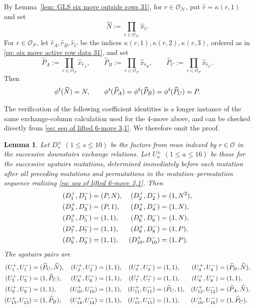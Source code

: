 \documentclass[12pt, leqno]{amsart}
\numberwithin{equation}{section}
\theoremstyle{plain}
\newtheorem{lemma}{Lemma}[section]
\theoremstyle{definition}
\renewcommand{\le}{\leqslant}
\newcommand{\seteq}{\mathbin{:=}}
\newcommand{\ii}{ \textbf{\textit{i}}}
\newcommand{\hN}{\widehat{N}}
\newcommand{\hP}{\widehat{P}}
\newcommand{\hr}{\widehat{r}}
\newcommand{\hx}{\widehat{x}}
\newcommand{\calN}{\mathcal{N}}
\newcommand{\calO}{\mathcal{O}}
\newcommand{\calP}{\mathcal{P}}
\begin{document}
By Lemma~\ref{lem: GLS six move outside rows 31},  for $r\in\calO_{\calN}$, put $\hr=\kappa(r,1)$ and set
\[
\hN\seteq\prod_{r\in\calO_{\calN}}\hx_{\hr}.
\]
 For $r\in\calO_{\calP}$, let $\hr_A,\hr_B,\hr_C$ be the indices
$\kappa(r,1),\kappa(r,2),\kappa(r,3)$, ordered as in \eqref{eq: six move active row data 31},
and set
\[
\hP_A\seteq\prod_{r\in\calO_{\calP}}\hx_{\hr_A}, \qquad \hP_B\seteq\prod_{r\in\calO_{\calP}}\hx_{\hr_B},
\qquad
\hP_C\seteq\prod_{r\in\calO_{\calP}}\hx_{\hr_C}.
\]
Then
\[
\phi^\ii(\hN)=N,\qquad
\phi^\ii(\hP_A)=\phi^\ii(\hP_B)=\phi^\ii(\hP_C)=P.
\]

The verification of the following coefficient identities is a longer
instance of the same exchange-column calculation used for the
$4$-move above, and can be checked directly from
\eqref{eq: seq of lifted 6-move 3,1}. We therefore omit the proof.

\begin{lemma}\label{lem: tropical six move 31}
Let $D_s^\pm$ $(1\le s\le10)$ be the factors from  rows indexed by $r\in\calO$ in the
successive downstairs exchange relations. Let $U_a^\pm$ $(1\le a\le16)$
be those for the successive upstairs mutations, determined immediately
before each mutation after all preceding mutations and permutations
 in the mutation--permutation sequence realizing \eqref{eq: seq of lifted 6-move 3,1}. Then
\begin{align*}
(D_1^+,D_1^-)&=(P,N),&(D_2^+,D_2^-)&=(1,N^2),\allowdisplaybreaks\\
(D_3^+,D_3^-)&=(P,1),&(D_4^+,D_4^-)&=(1,N),\allowdisplaybreaks\\
(D_5^+,D_5^-)&=(1,1),&(D_6^+,D_6^-)&=(1,N),\allowdisplaybreaks\\
(D_7^+,D_7^-)&=(1,1),&(D_8^+,D_8^-)&=(1,P),\allowdisplaybreaks\\
(D_9^+,D_9^-)&=(1,1),&(D_{10}^+,D_{10}^-)&=(1,P).
\end{align*}
The upstairs pairs are
\begin{align*}
(U_1^+,U_1^-)&=(\hP_C,\hN),&
(U_2^+,U_2^-)&=(1,1),&
(U_3^+,U_3^-)&=(1,1),&
(U_4^+,U_4^-)&=(\hP_B,\hN),\allowdisplaybreaks\\
(U_5^+,U_5^-)&=(1,\hP_C),&
(U_6^+,U_6^-)&=(1,1),&
(U_7^+,U_7^-)&=(1,1),&
(U_8^+,U_8^-)&=(1,1),\allowdisplaybreaks\\
(U_9^+,U_9^-)&=(1,1),&
(U_{10}^+,U_{10}^-)&=(1,1),&
(U_{11}^+,U_{11}^-)&=(\hP_C,1),&
(U_{12}^+,U_{12}^-)&=(\hP_A,\hN),\allowdisplaybreaks\\
(U_{13}^+,U_{13}^-)&=(1,\hP_B),&
(U_{14}^+,U_{14}^-)&=(1,1),&
(U_{15}^+,U_{15}^-)&=(1,1),&
(U_{16}^+,U_{16}^-)&=(1,\hP_C).
\end{align*}
\end{lemma}
\end{document}
